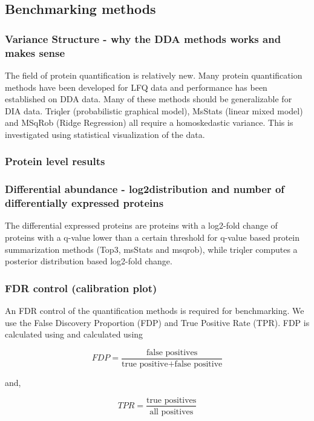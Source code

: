 \documentclass[10pt,letterpaper]{article}
\begin{document}
\subsection*{Benchmarking methods}

\subsubsection*{Variance Structure - why the DDA methods works and makes sense}
The field of protein quantification is relatively new. Many protein quantification methods have been developed for LFQ data and performance has been established on DDA data. Many of these methods should be generalizable for DIA data. Triqler (probabilistic graphical model), MsStats (linear mixed model) and MSqRob (Ridge Regression) all require a homoskedastic variance. This is investigated using statistical visualization of the data.

\subsubsection*{Protein level results}

\subsubsection*{Differential abundance - log2distribution and number of differentially expressed proteins}
The differential expressed proteins are proteins with a log2-fold change of proteins with a q-value lower than a certain threshold for q-value based protein summarization methods (Top3, msStats and msqrob), while triqler computes a posterior distribution based  log2-fold change. 


\subsubsection*{FDR control (calibration plot)}
An FDR control of the quantification methods is required for benchmarking. We use the False Discovery Proportion (FDP) and True Positive Rate (TPR). FDP is calculated using and calculated using 

	\[FDP = \frac{ \text{false positives}}{\text{true positive} + \text{false positive}} \]

and,

	\[TPR = \frac{\text{true positives}}{\text{all positives}} \]
\end{document}
